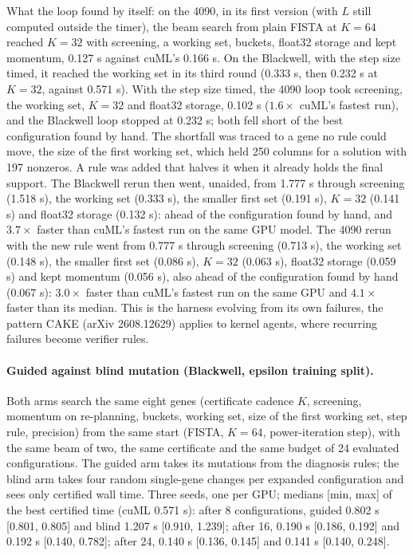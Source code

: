 What the loop found by itself: on the 4090, in its first version (with $L$
still computed outside the timer), the beam search from plain FISTA at $K=64$
reached $K=32$ with screening, a working set, buckets, float32 storage and
kept momentum, 0.127 s against cuML's 0.166 s. On the Blackwell, with the step
size timed, it reached the working set in its third round (0.333 s, then 0.232 s
at $K=32$, against 0.571 s). With the step size timed, the 4090 loop took screening, the working set,
$K=32$ and float32 storage, 0.102 s ($1.6\times$ cuML's fastest run), and the
Blackwell loop stopped at 0.232 s; both fell short of the best configuration
found by hand. The shortfall was traced to a gene no rule could move, the size
of the first working set, which held 250 columns for a solution with 197
nonzeros. A rule was added that halves it when it already holds the final
support. The Blackwell rerun then went, unaided, from 1.777 s through screening
(1.518 s), the working set (0.333 s), the smaller first set (0.191 s), $K=32$
(0.141 s) and float32 storage (0.132 s): ahead of the configuration found by
hand, and $3.7\times$ faster than cuML's fastest run on the same GPU model. The
4090 rerun with the new rule went from 0.777 s through screening (0.713 s), the
working set (0.148 s), the smaller first set (0.086 s), $K=32$ (0.063 s), float32
storage (0.059 s) and kept momentum (0.056 s), also ahead of the configuration
found by hand (0.067 s): $3.0\times$ faster than cuML's fastest run on the same GPU
and $4.1\times$ faster than its median. This is the harness evolving from
its own failures, the pattern CAKE (arXiv 2608.12629) applies to kernel agents,
where recurring failures become verifier rules.

\paragraph{Guided against blind mutation (Blackwell, epsilon training split).}
 Both arms search the same eight genes
(certificate cadence $K$, screening, momentum on re-planning, buckets, working
set, size of the first working set, step rule, precision) from the same start
(FISTA, $K=64$, power-iteration step), with the same beam of two, the same
certificate and the same budget of 24 evaluated configurations. The guided arm
takes its mutations from the diagnosis rules; the blind arm takes four random
single-gene changes per expanded configuration and sees only certified wall
time. Three seeds, one per GPU; medians [min, max] of the best certified time
(cuML 0.571 s): after 8 configurations, guided 0.802 s [0.801, 0.805] and blind
1.207 s [0.910, 1.239]; after 16, 0.190 s [0.186, 0.192] and 0.192 s [0.140,
0.782]; after 24, 0.140 s [0.136, 0.145] and 0.141 s [0.140, 0.248].


